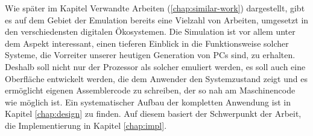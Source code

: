 Wie später im Kapitel \glqq Verwandte Arbeiten\grqq{} (\ref{chap:similar-work}) dargestellt, gibt es auf dem Gebiet der Emulation bereits eine Vielzahl von Arbeiten, umgesetzt in den verschiedensten digitalen Ökosystemen. Die Simulation ist vor allem unter dem Aspekt interessant, einen tieferen Einblick in die Funktionsweise solcher Systeme, die Vorreiter unserer heutigen Generation von PCs sind, zu erhalten. Deshalb soll nicht nur der Prozessor als solcher emuliert werden, es soll auch eine Oberfläche entwickelt werden, die dem Anwender den Systemzustand zeigt und es ermöglicht eigenen Assemblercode zu schreiben, der so nah am Maschinencode wie möglich ist. Ein systematischer Aufbau der kompletten Anwendung ist in Kapitel \ref{chap:design} zu finden. Auf diesem basiert der Schwerpunkt der Arbeit, die Implementierung in Kapitel \ref{chap:impl}.

